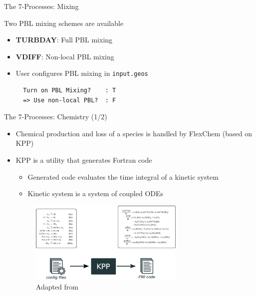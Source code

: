 \documentclass[10pt]{beamer}
\begin{document}
\begin{frame}[fragile]{The 7-Processes: Mixing}
\begin{minipage}[c]{0.6\textwidth}
        \vspace{0.5cm}
        Two PBL mixing schemes are available
        \begin{itemize}
            \item \textbf{TURBDAY}: Full PBL mixing
            \item \textbf{VDIFF}: Non-local PBL mixing
            \item User configures PBL mixing in \texttt{input.geos}
            \begin{verbatim}
  Turn on PBL Mixing?    : T
  => Use non-local PBL?  : F
            \end{verbatim}
        \end{itemize}
    \end{minipage}
\end{frame}

\begin{frame}[fragile]{The 7-Processes: Chemistry (1/2)}
    \begin{itemize}
        \item Chemical production and loss of a species is handled by FlexChem (based on KPP)
        \item KPP is a utility that generates Fortran code 
        \begin{itemize}
            \item Generated code evaluates the time integral of a kinetic system
            \item Kinetic system is a system of coupled ODEs
        \end{itemize}
        \vfill
        \begin{figure}
            \centering
            \includegraphics[width=0.7\textwidth]{kpp.eps}
            \captionsetup{labelformat=empty}
            \caption{Adapted from \cite{sandu_technical_2006}}
        \end{figure}
    \end{itemize}
\end{frame}
\end{document}
